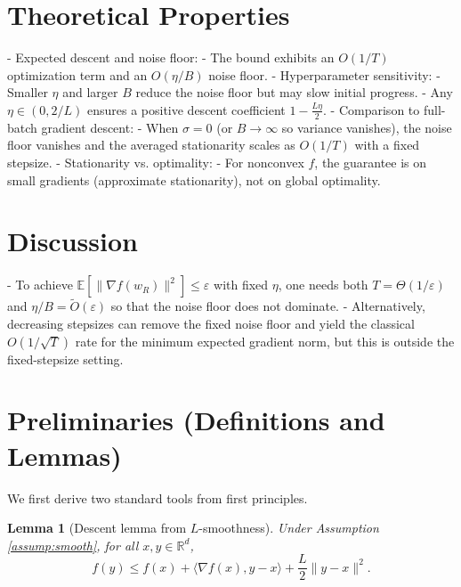 \documentclass[11pt]{article}
\newtheorem{lemma}{Lemma}
\newcommand{\E}{\mathbb{E}}
\newcommand{\R}{\mathbb{R}}
\begin{document}
\section*{Theoretical Properties}
- Expected descent and noise floor:
  - The bound exhibits an $O(1/T)$ optimization term and an $O(\eta/B)$ noise floor.
- Hyperparameter sensitivity:
  - Smaller $\eta$ and larger $B$ reduce the noise floor but may slow initial progress.
  - Any $\eta \in (0,2/L)$ ensures a positive descent coefficient $1-\frac{L\eta}{2}$.
- Comparison to full-batch gradient descent:
  - When $\sigma=0$ (or $B\to\infty$ so variance vanishes), the noise floor vanishes and the averaged stationarity scales as $O(1/T)$ with a fixed stepsize.
- Stationarity vs. optimality:
  - For nonconvex $f$, the guarantee is on small gradients (approximate stationarity), not on global optimality.

\section*{Discussion}
- To achieve $\E[\|\nabla f(w_R)\|^2]\le \varepsilon$ with fixed $\eta$, one needs both $T=\Theta(1/\varepsilon)$ and $\eta/B=\tilde{O}(\varepsilon)$ so that the noise floor does not dominate.
- Alternatively, decreasing stepsizes can remove the fixed noise floor and yield the classical $O(1/\sqrt{T})$ rate for the minimum expected gradient norm, but this is outside the fixed-stepsize setting.

\section*{Preliminaries (Definitions and Lemmas)}
We first derive two standard tools from first principles.

\begin{lemma}[Descent lemma from $L$-smoothness]
\label{lem:descent}
Under Assumption \ref{assump:smooth}, for all $x,y\in\R^d$,
\[
f(y) \le f(x) + \langle \nabla f(x), y-x\rangle + \frac{L}{2}\|y-x\|^2.
\]
\end{lemma}
\end{document}
